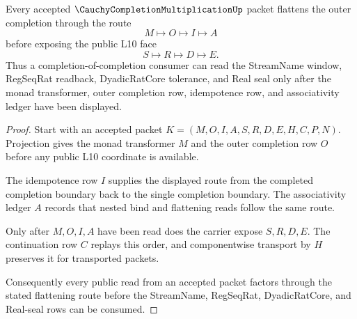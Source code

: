 \begin{theorem}
\label{thm:cauchy-completion-multiplication-flattening-route}
Every accepted $\CauchyCompletionMultiplicationUp$ packet flattens the outer completion through the route
$$
M \longmapsto O \longmapsto I \longmapsto A
$$
before exposing the public L10 face
$$
S \longmapsto R \longmapsto D \longmapsto E .
$$
Thus a completion-of-completion consumer can read the StreamName window, RegSeqRat readback, DyadicRatCore tolerance, and Real seal only after the monad transformer, outer completion row, idempotence row, and associativity ledger have been displayed.
\end{theorem}
\begin{proof}
Start with an accepted packet $K=(M,O,I,A,S,R,D,E,H,C,P,N)$. Projection gives the monad transformer $M$ and the outer completion row $O$ before any public L10 coordinate is available.

The idempotence row $I$ supplies the displayed route from the completed completion boundary back to the single completion boundary. The associativity ledger $A$ records that nested bind and flattening reads follow the same route.

Only after $M,O,I,A$ have been read does the carrier expose $S,R,D,E$. The continuation row $C$ replays this order, and componentwise transport by $H$ preserves it for transported packets.

Consequently every public read from an accepted packet factors through the stated flattening route before the StreamName, RegSeqRat, DyadicRatCore, and Real-seal rows can be consumed.
\end{proof}

